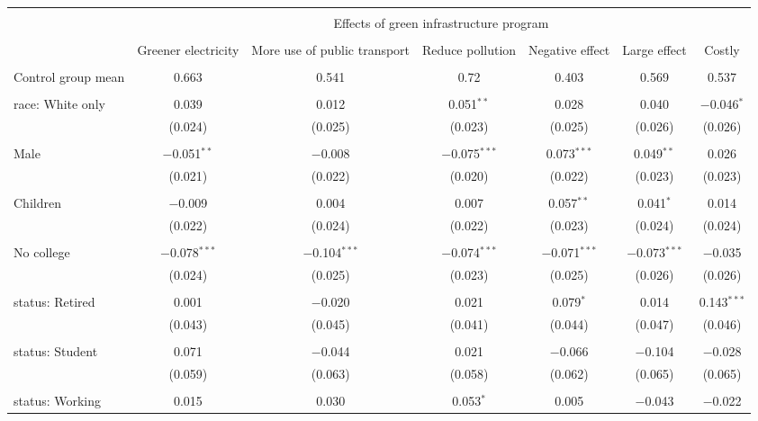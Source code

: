 
\begin{tabular}{@{\extracolsep{5pt}}lcccccc} 
\\[-1.8ex]\hline 
\hline \\[-1.8ex] 
 & \multicolumn{6}{c}{Effects of green infrastructure program} \\ 
\cline{2-7} 
\\[-1.8ex] & Greener electricity & More use of public transport & Reduce pollution & Negative effect & Large effect & Costly \\ 
\hline \\[-1.8ex] 
 Control group mean & 0.663 & 0.541 & 0.72 & 0.403 & 0.569 & 0.537  \\ \hline \\[-1.8ex] race: White only & 0.039 & 0.012 & 0.051$^{**}$ & 0.028 & 0.040 & $-$0.046$^{*}$ \\ 
  & (0.024) & (0.025) & (0.023) & (0.025) & (0.026) & (0.026) \\ 
  & & & & & & \\ 
 Male & $-$0.051$^{**}$ & $-$0.008 & $-$0.075$^{***}$ & 0.073$^{***}$ & 0.049$^{**}$ & 0.026 \\ 
  & (0.021) & (0.022) & (0.020) & (0.022) & (0.023) & (0.023) \\ 
  & & & & & & \\ 
 Children & $-$0.009 & 0.004 & 0.007 & 0.057$^{**}$ & 0.041$^{*}$ & 0.014 \\ 
  & (0.022) & (0.024) & (0.022) & (0.023) & (0.024) & (0.024) \\ 
  & & & & & & \\ 
 No college & $-$0.078$^{***}$ & $-$0.104$^{***}$ & $-$0.074$^{***}$ & $-$0.071$^{***}$ & $-$0.073$^{***}$ & $-$0.035 \\ 
  & (0.024) & (0.025) & (0.023) & (0.025) & (0.026) & (0.026) \\ 
  & & & & & & \\ 
 status: Retired & 0.001 & $-$0.020 & 0.021 & 0.079$^{*}$ & 0.014 & 0.143$^{***}$ \\ 
  & (0.043) & (0.045) & (0.041) & (0.044) & (0.047) & (0.046) \\ 
  & & & & & & \\ 
 status: Student & 0.071 & $-$0.044 & 0.021 & $-$0.066 & $-$0.104 & $-$0.028 \\ 
  & (0.059) & (0.063) & (0.058) & (0.062) & (0.065) & (0.065) \\ 
  & & & & & & \\ 
 status: Working & 0.015 & 0.030 & 0.053$^{*}$ & 0.005 & $-$0.043 & $-$0.022 \\ 

\end{tabular}
